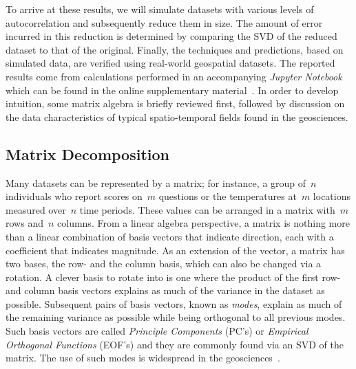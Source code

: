 \documentclass[ijgi,article,submit,moreauthors,pdftex,10pt,a4paper]{Definitions/mdpi}
\begin{document}
To arrive at these results, we will simulate datasets with various levels of autocorrelation and subsequently reduce them in size. The amount of error incurred in this reduction is determined by comparing the SVD of the reduced dataset to that of the original. Finally, the techniques and predictions, based on simulated data, are verified using real-world geospatial datasets. The reported results come from calculations performed in an accompanying \textit{Jupyter Notebook} which can be found in the online supplementary material~\cite{Bogaardt2018}. In order to develop intuition, some matrix algebra is briefly reviewed first, followed by discussion on the data characteristics of typical spatio-temporal fields found in the geosciences.

\subsection{Matrix Decomposition}
\label{sec:Introduction/Matrix Decomposition} %

Many datasets can be represented by a matrix; for instance, a group of~$n$ individuals who report scores on~$m$ questions or the temperatures at~$m$ locations measured over~$n$ time periods. These values can be arranged in a matrix with~$m$ rows and~$n$ columns. From a linear algebra perspective, a matrix is nothing more than a linear combination of basis vectors that indicate direction, each with a coefficient that indicates magnitude. As an extension of the vector, a matrix has two bases, the row- and the column basis, which can also be changed via a rotation. A clever basis to rotate into is one where the product of the first row- and column basis vectors explains as much of the variance in the dataset as possible. Subsequent pairs of basis vectors, known as \textit{modes}, explain as much of the remaining variance as possible while being orthogonal to all previous modes. Such basis vectors are called \textit{Principle Components} (PC's) or \textit{Empirical Orthogonal Functions} (EOF's) and they are commonly found via an SVD of the matrix. The use of such modes is widespread in the geosciences~\cite{demirel10,hannachi07}.
\end{document}

